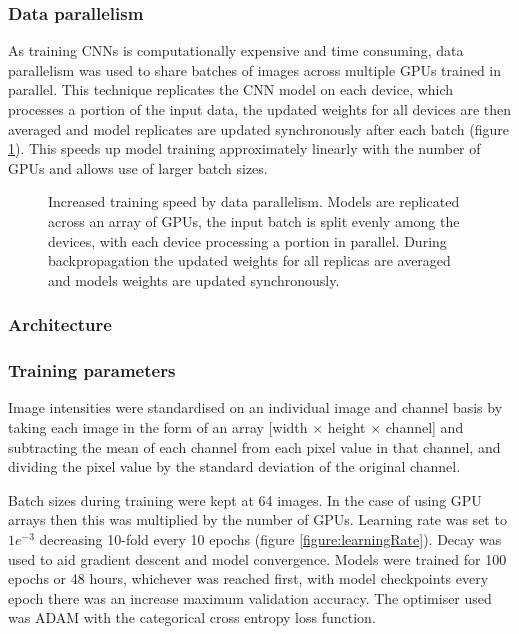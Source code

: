 \documentclass[a4paper,11pt,twoside,openright]{scrbook}
\begin{document}
\subsubsection{Data parallelism}
As training CNNs is computationally expensive and time consuming, data parallelism was used to share batches of images across multiple GPUs trained in parallel.
This technique replicates the CNN model on each device, which processes a portion of the input data, the updated weights for all devices are then averaged and model replicates are updated synchronously after each batch (figure \ref{figure:multi_GPU}).
This speeds up model training approximately linearly with the number of GPUs and allows use of larger batch sizes.

\begin{figure}
    \captionsetup{width=0.8\textwidth}
    \caption[Multi-GPU distributed training]{Increased training speed by data parallelism. Models are replicated across an array of GPUs, the input batch is split evenly among the devices, with each device processing a portion in parallel.
During backpropagation the updated weights for all replicas are averaged and models weights are updated synchronously.}
    
    \label{figure:multi_GPU}
\end{figure}

\subsubsection{Architecture}


\subsubsection{Training parameters}

Image intensities were standardised on an individual image and channel basis by taking each image in the form of an array [width $\times$ height $\times$ channel] and subtracting the mean of each channel from each pixel value in that channel, and dividing the pixel value by the standard deviation of the original channel.

Batch sizes during training were kept at 64 images.
In the case of using GPU arrays then this was multiplied by the number of GPUs.
Learning rate was set to $1e^{-3}$ decreasing 10-fold every 10 epochs (figure \ref{figure:learningRate}).
Decay was used to aid gradient descent and model convergence.
Models were trained for 100 epochs or 48 hours, whichever was reached first, with model checkpoints every epoch there was an increase maximum validation accuracy.
The optimiser used was ADAM \cite{Kingma2014} with the categorical cross entropy loss function.
\end{document}
